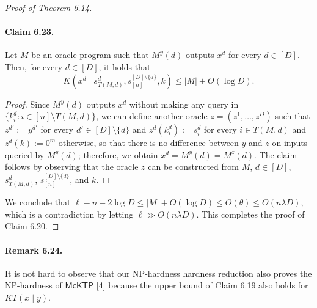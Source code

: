 \begin{proof}[Proof of Theorem 6.14]
\paragraph{Claim 6.23.}
Let $M$ be an oracle program such that $M^y(d)$ outputs $x^d$ for every $d\in[D]$. Then, for every $d\in[D]$, it holds that
\[K(x^d\mid s_{T(M,d)}^d,s_{[n]}^{[D]\setminus\{d\}},k)\leq|M|+O(\log D).\]
\begin{proof}
Since $M^y(d)$ outputs $x^d$ without making any query in $\{k_i^d:i\in[n]\setminus T(M,d)\}$, we can define another oracle $z=(z^1,\ldots,z^D)$ such that $z^{d'}:=y^{d'}$ for every $d'\in[D]\setminus\{d\}$ and $z^d(k_i^d):=s_i^d$ for every $i\in T(M,d)$ and $z^d(k):=0^m$ otherwise, so that there is no difference between $y$ and $z$ on inputs queried by $M^y(d)$; therefore, we obtain $x^d=M^y(d)=M^z(d)$. The claim follows by observing that the oracle $z$ can be constructed from $M$, $d\in[D]$, $s_{T(M,d)}^d$, $s_{[n]}^{[D]\setminus\{d\}}$, and $k$.
\end{proof}
We conclude that $\ell-n-2\log D\leq|M|+O(\log D)\leq O(\theta)\leq O(n\lambda D)$, which is a contradiction by letting $\ell\gg O(n\lambda D)$. This completes the proof of Claim 6.20.
\end{proof}
\paragraph{Remark 6.24.}
It is not hard to observe that our NP-hardness hardness reduction also proves the NP-hardness of $\mathsf{McKTP}$ [4] because the upper bound of Claim 6.19 also holds for $KT(x\mid y)$.
